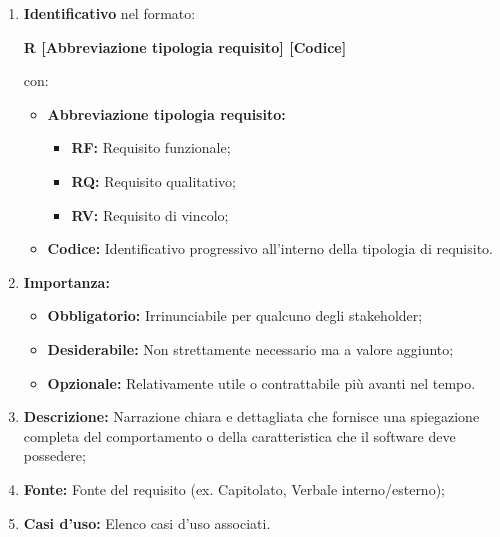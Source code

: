 \begin{enumerate}
    \item \textbf{Identificativo} nel formato:\\
          \begin{center}
              \textbf{R [Abbreviazione tipologia requisito] [Codice]}
          \end{center}
          con:
          \begin{itemize}
              \item \textbf{Abbreviazione tipologia requisito:}
                    \begin{itemize}
                        \item \textbf{RF:} Requisito funzionale;
                        \item \textbf{RQ:} Requisito qualitativo;
                        \item \textbf{RV:} Requisito di vincolo;
                    \end{itemize}
              \item \textbf{Codice:} Identificativo progressivo all'interno della tipologia di requisito.
          \end{itemize}
    \item \textbf{Importanza:}
          \begin{itemize}
              \item \textbf{Obbligatorio:} Irrinunciabile per qualcuno degli stakeholder;
              \item \textbf{Desiderabile:} Non strettamente necessario ma a valore aggiunto;
              \item \textbf{Opzionale:} Relativamente utile o contrattabile più avanti nel tempo.
          \end{itemize}
    \item \textbf{Descrizione:} Narrazione chiara e dettagliata che fornisce una spiegazione completa del comportamento o della caratteristica che il software deve possedere;
    \item \textbf{Fonte:} Fonte del requisito (ex. Capitolato, Verbale interno/esterno);
    \item \textbf{Casi d'uso:} Elenco casi d'uso associati.
\end{enumerate}

